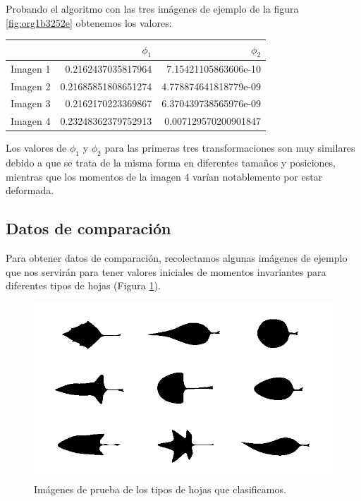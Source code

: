 \documentclass[letter]{article}
\begin{document}
Probando el algoritmo con las tres imágenes de ejemplo de la figura \ref{fig:org1b3252e} obtenemos
los valores:

\begin{center}
\begin{tabular}{lrr}
 & \(\phi_1\) & \(\phi_2\)\\
\hline
Imagen 1 & 0.2162437035817964 & 7.15421105863606e-10\\
Imagen 2 & 0.21685851808651274 & 4.778874641818779e-09\\
Imagen 3 & 0.2162170223369867 & 6.370439738565976e-09\\
Imagen 4 & 0.23248362379752913 & 0.007129570200901847\\
\end{tabular}
\end{center}

Los valores de \(\phi_1\) y \(\phi_2\) para las primeras tres transformaciones son
muy similares debido a que se trata de la misma forma en diferentes tamaños y
posiciones, mientras que los momentos de la imagen 4 varían notablemente por
estar deformada.

\subsection{Datos de comparación}
\label{sec:org33022ec}
Para obtener datos de comparación, recolectamos algunas imágenes de ejemplo que
nos servirán para tener valores iniciales de momentos invariantes para
diferentes tipos de hojas (Figura \ref{fig:org02b0811}).

\begin{figure}[htbp]
\centering
\includegraphics[width=.9\linewidth]{./images/leaves.png}
\caption{\label{fig:org02b0811}Imágenes de prueba de los tipos de hojas que clasificamos.}
\end{figure}
\end{document}
